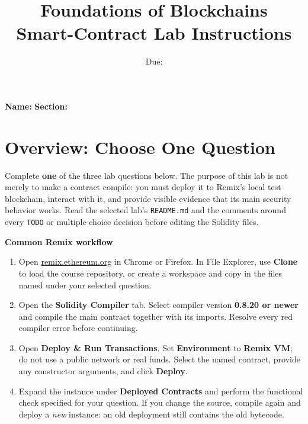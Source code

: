\documentclass[11pt,letterpaper]{article}
\begin{document}
\title{\textbf{Foundations of Blockchains}\\
\large Smart-Contract Lab Instructions}
\author{}
\date{Due: \underline{\hspace{2.2in}}}
\maketitle

\textbf{Name:} \underline{\hspace{2.6in}}
\hfill
\textbf{Section:} \underline{\hspace{1.4in}}

\section*{Overview: Choose One Question}

Complete \textbf{one} of the three lab questions below. The purpose of this lab
is not merely to make a contract compile: you must deploy it to Remix's local
test blockchain, interact with it, and provide visible evidence that its main
security behavior works. Read the selected lab's \texttt{README.md} and the
comments around every \texttt{TODO} or multiple-choice decision before editing
the Solidity files.

\textbf{Common Remix workflow}

\begin{enumerate}[leftmargin=0.3in]
    \item Open \href{https://remix.ethereum.org}{remix.ethereum.org} in Chrome
    or Firefox. In File Explorer, use \textbf{Clone} to load the course
    repository, or create a workspace and copy in the files named under your
    selected question.
    \item Open the \textbf{Solidity Compiler} tab. Select compiler version
    \textbf{0.8.20 or newer} and compile the main contract together with its
    imports. Resolve every red compiler error before continuing.
    \item Open \textbf{Deploy \& Run Transactions}. Set \textbf{Environment}
    to \textbf{Remix VM}; do not use a public network or real funds. Select the
    named contract, provide any constructor arguments, and click
    \textbf{Deploy}.
    \item Expand the instance under \textbf{Deployed Contracts} and perform
    the functional check specified for your question. If you change the source,
    compile again and deploy a \emph{new} instance: an old deployment still
    contains the old bytecode.
\end{enumerate}
\end{document}
